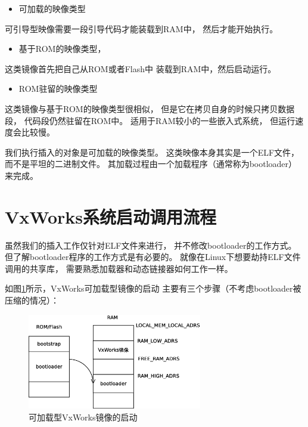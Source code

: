 \begin{itemize}
  \item 可加载的映像类型
\end{itemize}

可引导型映像需要一段引导代码才能装载到RAM中，
然后才能开始执行。


\begin{itemize}
  \item 基于ROM的映像类型，
\end{itemize}

这类镜像首先把自己从ROM或者Flash中
装载到RAM中，然后启动运行。

\begin{itemize}
  \item ROM驻留的映像类型
\end{itemize}

这类镜像与基于ROM的映像类型很相似，
但是它在拷贝自身的时候只拷贝数据段，
代码段仍然驻留在ROM中。
适用于RAM较小的一些嵌入式系统，
但运行速度会比较慢。

我们执行插入的对象是可加载的映像类型。
这类映像本身其实是一个ELF文件，
而不是平坦的二进制文件。
其加载过程由一个加载程序（通常称为bootloader）来完成。


\section{VxWorks系统启动调用流程}

虽然我们的插入工作仅针对ELF文件来进行，
并不修改bootloader的工作方式。
但了解bootloader程序的工作方式是有必要的。
就像在Linux下想要劫持ELF文件调用的共享库，
需要熟悉加载器和动态链接器如何工作一样。

如图\ref{boot}所示，VxWorks可加载型镜像的启动
主要有三个步骤（不考虑bootloader被压缩的情况）：

\begin{figure}[h!]
    \centering
    \includegraphics[width=0.68\textwidth]{figure/boot.eps}
    \caption{可加载型VxWorks镜像的启动}
    \label{boot}
\end{figure}

